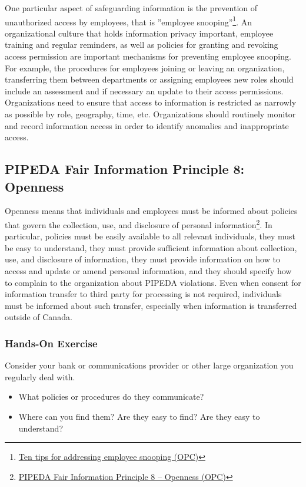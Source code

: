 One particular aspect of safeguarding information is the prevention of unauthorized access by employees, that is ''employee snooping''\footnote{\href{https://www.priv.gc.ca/en/privacy-topics/business-privacy/safeguards-and-breaches/privacy-breaches/02_05_d_65_tips/}{Ten tips for addressing employee snooping (OPC)}}. An organizational culture that holds information privacy important, employee training and regular reminders, as well as policies for granting and revoking access permission are important mechanisms for preventing employee snooping. For example, the procedures for employees joining or leaving an organization, transferring them between departments or assigning employees new roles should include an assessment and if necessary an update to their access permissions. Organizations need to ensure that access to information is restricted as narrowly as possible by role, geography, time, etc. Organizations should routinely monitor and record information access in order to identify anomalies and inappropriate access. 

\subsection*{PIPEDA Fair Information Principle 8: Openness}

Openness means that individuals and employees must be informed about policies that govern the collection, use, and disclosure of personal information\footnote{\href{https://www.priv.gc.ca/en/privacy-topics/privacy-laws-in-canada/the-personal-information-protection-and-electronic-documents-act-pipeda/p_principle/principles/p_openness/}{PIPEDA Fair Information Principle 8 -- Openness (OPC)}}. In particular, policies must be easily available to all relevant individuals, they must be easy to understand, they must provide sufficient information about collection, use, and disclosure of information, they must provide information on how to access and update or amend personal information, and they should specify how to complain to the organization about PIPEDA violations. Even when consent for information transfer to third party for processing is not required, individuals must be informed about such transfer, especially when information is transferred outside of Canada.

\begin{tcolorbox}[colback=code]
\subsubsection*{Hands-On Exercise}

Consider your bank or communications provider or other large organization you regularly deal with. 
\begin{itemize}
  \item What policies or procedures do they communicate?
  \item Where can you find them? Are they easy to find? Are they easy to understand?
\end{itemize}
\end{tcolorbox}

